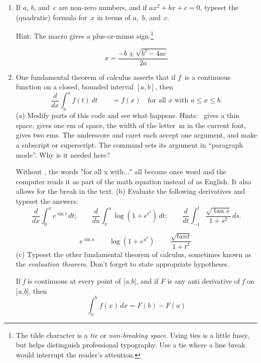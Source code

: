 \begin{enumerate}
\soln If you do not include the backlash on a macro name, the Greek letter is spelled out in English instead of being written as a Greek symbol. If you use dollar signs instead of display math, it deletes the previously existing break in the text allotted to the equation. It appears as though nothing changes when you add or remove characters inside math mode.  
\item If $a$, $b$, and~$c$ are non-zero numbers, and if
  $ax^{2} + bx + c = 0$, typeset the (quadratic) formula for~$x$ in
  terms of $a$,~$b$, and~$c$.

  Hint: The macro  gives a plus-or-minus sign.\footnote{The
    tilde character is a \emph{tie} or \emph{non-breaking
      space}. Using ties is a little fussy, but helps distinguish
    professional typography. Use a tie where a line break would
    interrupt the reader's attention.}

  \soln \[
  x=\frac{-b\pm\sqrt{b^2-4ac}}{2a}
\]
\item One fundamental theorem of calculus asserts that if $f$~is a
  continuous function on a closed, bounded interval $[a, b]$, then
  \[
  \frac{d}{dx} \int_{a}^{x} f(t)\, dt \qquad = f(x)
  \quad\text{for all~$x$ with $a \leq x \leq b$.}
  \]
  (a) Modify parts of this code and see what happens. Hints:
  \Cmd{,}~gives a thin space,  gives one em of space, the
  width of the letter~m in the current font,  gives two
  ems. The underscore and caret each accept one argument, and make a
  subscript or superscript. The  command sets its argument
  in ``paragraph mode''. Why is it needed here?
  
  \soln Without , the words "for all x with..." all become once word and the computer reads it as part of the math equation instead of as English. It also allows for the break in the text. 
  (b) Evaluate the following derivatives and typeset the answers:
  \[
  \frac{d}{dx} \int_{0}^{x} e^{\sin t}\, dt;\qquad
  \frac{d}{du} \int_{\pi}^{u} \log(1 + e^{t^{2}})\, dt;\qquad
  \frac{d}{dt} \int_{-1}^{t} \frac{\sqrt{\tan s}}{1 + s^{2}}\, ds.
  \]

  \soln \[
  e^{\sin x} \qquad \log(1+e^{u^{2}})\ \qquad \frac{\sqrt{tan t}}{1+t^{2}}\ 
\]
  (c) Typeset the other fundamental theorem of calculus, sometimes
  known as the \emph{evaluation theorem}. Don't forget to state
  appropriate hypotheses.

  \soln If \emph{f} is continuous at every point of [\emph{a,b}], and if \emph{F} is any anti derivative of \emph{f} on [\emph{a,b}], then 
  \[
\int_{a}^{b} f(x)\, dx = F(b)-F(a)
\]
\end{enumerate}

